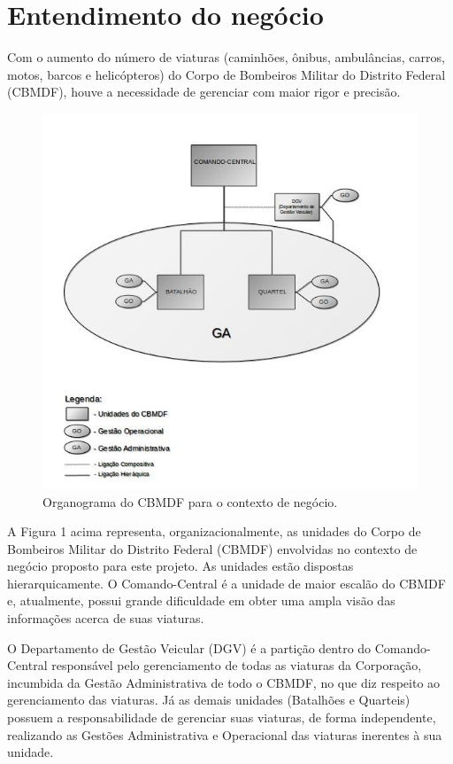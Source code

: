 \chapter{Entendimento do negócio}

  Com o aumento do número de viaturas (caminhões, ônibus, ambulâncias, carros, motos, barcos e helicópteros) do Corpo de 
  Bombeiros Militar do Distrito Federal (CBMDF), houve a necessidade de gerenciar com maior rigor e precisão.

  \begin{figure}[!htbp]
    \centering
    \includegraphics[scale=0.7, angle=0]{editaveis/figuras/entendimento_negocio}
    \caption{Organograma do CBMDF para o contexto de negócio.}
  \end{figure}
  
  A Figura 1 acima representa, organizacionalmente, as unidades do Corpo de Bombeiros Militar do Distrito Federal (CBMDF)
  envolvidas no contexto de negócio proposto para este projeto. As unidades estão dispostas hierarquicamente. 
  O Comando-Central é a unidade de maior escalão do CBMDF e, atualmente, possui grande dificuldade em obter uma ampla 
  visão das informações acerca de suas viaturas.
  
  \pagebreak

  O Departamento de Gestão Veicular (DGV) é a partição dentro do Comando-Central responsável pelo gerenciamento de todas 
  as viaturas da Corporação, incumbida da Gestão Administrativa de todo o CBMDF, no que diz respeito ao gerenciamento das 
  viaturas. Já as demais unidades (Batalhões e Quarteis) possuem a responsabilidade de gerenciar suas viaturas, de forma 
  independente, realizando as Gestões Administrativa e Operacional das viaturas inerentes à sua unidade.
  
